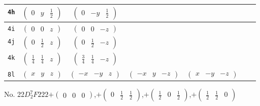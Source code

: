 \documentclass[fleqn,9pt,landscape]{jsarticle}
\begin{document}
\begin{center}
\begin{longtable}{ccccccc}
{\tt 4h} & $ \begin{pmatrix} 0 & y & \frac{1}{2} \end{pmatrix} $ & $ \begin{pmatrix} 0 & - y & \frac{1}{2} \end{pmatrix} $ & $  $ & $  $ \\ \hline
{\tt 4i} & $ \begin{pmatrix} 0 & 0 & z \end{pmatrix} $ & $ \begin{pmatrix} 0 & 0 & - z \end{pmatrix} $ & $  $ & $  $ \\ \hline
{\tt 4j} & $ \begin{pmatrix} 0 & \frac{1}{2} & z \end{pmatrix} $ & $ \begin{pmatrix} 0 & \frac{1}{2} & - z \end{pmatrix} $ & $  $ & $  $ \\ \hline
{\tt 4k} & $ \begin{pmatrix} \frac{1}{4} & \frac{1}{4} & z \end{pmatrix} $ & $ \begin{pmatrix} \frac{3}{4} & \frac{1}{4} & - z \end{pmatrix} $ & $  $ & $  $ \\ \hline
{\tt 8l} & $ \begin{pmatrix} x & y & z \end{pmatrix} $ & $ \begin{pmatrix} - x & - y & z \end{pmatrix} $ & $ \begin{pmatrix} - x & y & - z \end{pmatrix} $ & $ \begin{pmatrix} x & - y & - z \end{pmatrix} $ \\
\end{longtable}
\end{center}
\newpage
No. 22\quad$D_{2}^{7}$\quad$F222$\quad[ orthorhombic ]\quad$+\begin{pmatrix} 0 & 0 & 0 \end{pmatrix}$,\quad $+\begin{pmatrix} 0 & \frac{1}{2} & \frac{1}{2} \end{pmatrix}$,\quad $+\begin{pmatrix} \frac{1}{2} & 0 & \frac{1}{2} \end{pmatrix}$,\quad $+\begin{pmatrix} \frac{1}{2} & \frac{1}{2} & 0 \end{pmatrix}$
\end{document}
